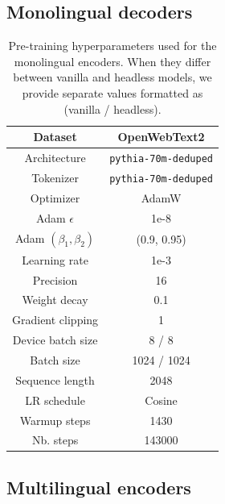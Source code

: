 \begin{appendices}
\subsection{Monolingual decoders}
\label{app:train_mono_dec}
\begin{table}[H]
\centering
\small
\begin{tabular}{c|c}
\toprule
Dataset & OpenWebText2  \\ \hline
Architecture & \texttt{pythia-70m-deduped} \\ \hline
Tokenizer & \texttt{pythia-70m-deduped} \\ \hline
Optimizer         & AdamW      \\ \hline
Adam $\epsilon$ & 1e-8   \\ \hline
Adam $(\beta_1, \beta_2)$ & (0.9, 0.95)   \\ \hline
Learning rate     & 1e-3       \\ \hline
Precision  & 16 \\ \hline
Weight decay      & 0.1       \\ \hline
Gradient clipping & 1          \\ \hline
Device batch size        & 8 / 8         \\ \hline
Batch size        & 1024 / 1024         \\ \hline
Sequence length   & 2048        \\ \hline
LR schedule       & Cosine \\ \hline
Warmup steps      & 1430      \\ \hline
Nb. steps         & 143000        \\ \bottomrule
\end{tabular}
\caption{Pre-training hyperparameters used for the monolingual encoders. When they differ between vanilla and headless models, we provide separate values formatted as (vanilla / headless).}
\end{table}

\subsection{Multilingual encoders}
\label{app:train_multi_enc}



\end{appendices}
